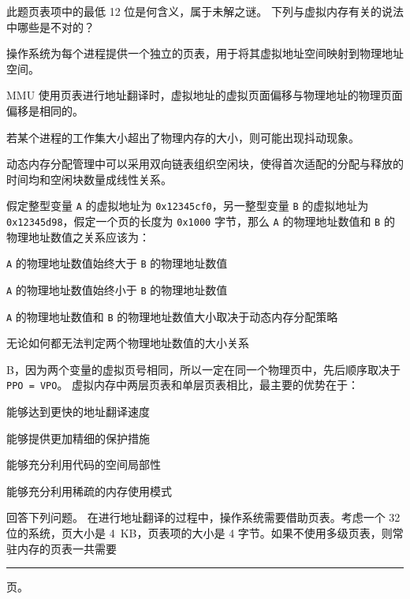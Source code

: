 \begin{problems}
        此题页表项中的最低 12 位是何含义，属于未解之谜。
         下列与虚拟内存有关的说法中哪些是不对的？
        \begin{choices}
            \item 操作系统为每个进程提供一个独立的页表，用于将其虚拟地址空间映射到物理地址空间。
            \item MMU 使用页表进行地址翻译时，虚拟地址的虚拟页面偏移与物理地址的物理页面偏移是相同的。
            \item 若某个进程的工作集大小超出了物理内存的大小，则可能出现抖动现象。
            \item 动态内存分配管理中可以采用双向链表组织空闲块，使得首次适配的分配与释放的时间均和空闲块数量成线性关系。
        \end{choices}
         假定整型变量 \verb|A| 的虚拟地址为 \verb|0x12345cf0|，另一整型变量 \verb|B| 的虚拟地址为 \verb|0x12345d98|，假定一个页的长度为 \verb|0x1000| 字节，那么 \verb|A| 的物理地址数值和 \verb|B| 的物理地址数值之关系应该为：
        \begin{choices}
            \item \verb|A| 的物理地址数值始终大于 \verb|B| 的物理地址数值
            \item \verb|A| 的物理地址数值始终小于 \verb|B| 的物理地址数值
            \item \verb|A| 的物理地址数值和 \verb|B| 的物理地址数值大小取决于动态内存分配策略
            \item 无论如何都无法判定两个物理地址数值的大小关系
        \end{choices}
        \sol B，因为两个变量的虚拟页号相同，所以一定在同一个物理页中，先后顺序取决于 \verb|PPO = VPO|。
         虚拟内存中两层页表和单层页表相比，最主要的优势在于：
        \begin{choices}
            \item 能够达到更快的地址翻译速度
            \item 能够提供更加精细的保护措施
            \item 能够充分利用代码的空间局部性
            \item 能够充分利用稀疏的内存使用模式
        \end{choices}
         回答下列问题。
        \qn 在进行地址翻译的过程中，操作系统需要借助页表。考虑一个 32 位的系统，页大小是 \SI{4}{KB}，页表项的大小是 4 字节。如果不使用多级页表，则常驻内存的页表一共需要 \rule{2.5cm}{0.25mm} 页。


\end{problems}
